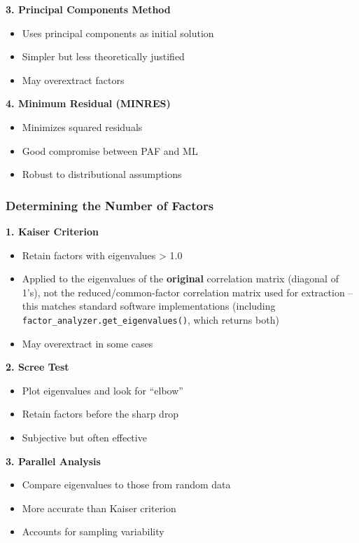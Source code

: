 \documentclass[
]{article}
\begin{document}
\textbf{3. Principal Components Method}

\begin{itemize}
\item
  Uses principal components as initial solution
\item
  Simpler but less theoretically justified
\item
  May overextract factors
\end{itemize}

\textbf{4. Minimum Residual (MINRES)}

\begin{itemize}
\item
  Minimizes squared residuals
\item
  Good compromise between PAF and ML
\item
  Robust to distributional assumptions
\end{itemize}

\subsubsection{Determining the Number of Factors}

\textbf{1. Kaiser Criterion}

\begin{itemize}
\item
  Retain factors with eigenvalues \textgreater{} 1.0
\item
  Applied to the eigenvalues of the \textbf{original} correlation matrix
  (diagonal of 1's), not the reduced/common-factor correlation matrix
  used for extraction -- this matches standard software implementations
  (including \texttt{factor\_analyzer.get\_eigenvalues()}, which returns
  both)
\item
  May overextract in some cases
\end{itemize}

\textbf{2. Scree Test}

\begin{itemize}
\item
  Plot eigenvalues and look for ``elbow''
\item
  Retain factors before the sharp drop
\item
  Subjective but often effective
\end{itemize}

\textbf{3. Parallel Analysis}

\begin{itemize}
\item
  Compare eigenvalues to those from random data
\item
  More accurate than Kaiser criterion
\item
  Accounts for sampling variability
\end{itemize}
\end{document}
